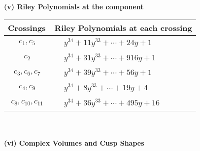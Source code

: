 \documentclass[1p]{elsarticle_modified}
\theoremstyle{definition}
\begin{document}
\newpage\renewcommand{\arraystretch}{1}
\flushleft \textbf{(v) Riley Polynomials at the component}\newline \\
\begin{tabular}{m{50pt}|m{274pt}}
Crossings & \hspace{64pt}Riley Polynomials at each crossing \\
\hline $$\begin{aligned}c_{1},c_{5}\end{aligned}$$&$\begin{aligned}
&y^{34}+11 y^{33}+\cdots+24 y+1
\end{aligned}$\\
\hline $$\begin{aligned}c_{2}\end{aligned}$$&$\begin{aligned}
&y^{34}+31 y^{33}+\cdots+916 y+1
\end{aligned}$\\
\hline $$\begin{aligned}c_{3},c_{6},c_{7}\end{aligned}$$&$\begin{aligned}
&y^{34}+39 y^{33}+\cdots+56 y+1
\end{aligned}$\\
\hline $$\begin{aligned}c_{4},c_{9}\end{aligned}$$&$\begin{aligned}
&y^{34}+8 y^{33}+\cdots+19 y+4
\end{aligned}$\\
\hline $$\begin{aligned}c_{8},c_{10},c_{11}\end{aligned}$$&$\begin{aligned}
&y^{34}+36 y^{33}+\cdots+495 y+16
\end{aligned}$\\
\hline
\end{tabular}\\~\\
\newpage\flushleft \textbf{(vi) Complex Volumes and Cusp Shapes}
\end{document}
